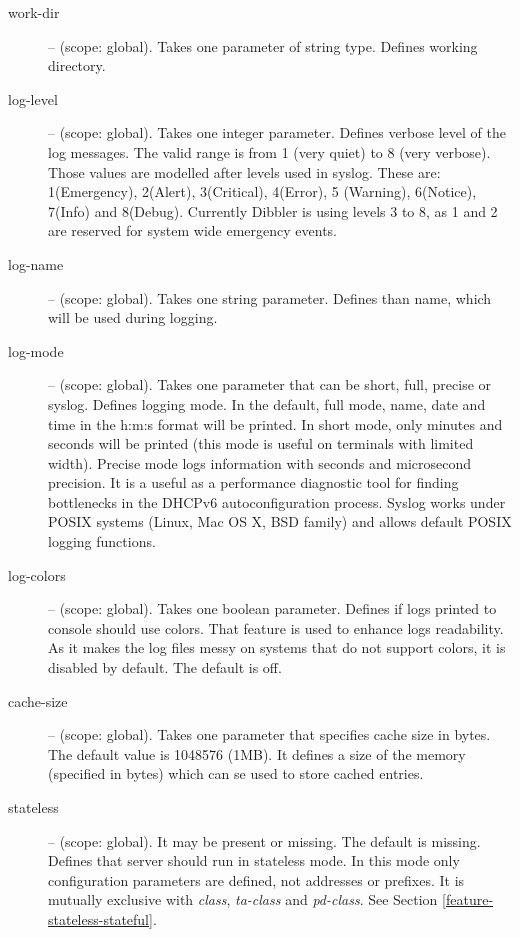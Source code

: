 \begin{description}
\item[work-dir] -- (scope: global). Takes one parameter of string
  type. Defines working directory.

\item[log-level] -- (scope: global). Takes one integer
  parameter. Defines verbose level of the log messages. The valid range
  is from 1 (very quiet) to 8 (very verbose). Those values are modelled
  after levels used in syslog. These are: 1(Emergency), 2(Alert),
  3(Critical), 4(Error), 5 (Warning), 6(Notice), 7(Info) and
  8(Debug). Currently Dibbler is using levels 3 to 8, as 1 and 2 are
  reserved for system wide emergency events.

\item[log-name] -- (scope: global). Takes one string
  parameter. Defines than name, which will be used during logging.

\item[log-mode] -- (scope: global). Takes one parameter that can be
  short, full, precise or syslog. Defines logging mode. In the
  default, full mode, name, date and time in the h:m:s format will be
  printed. In short mode, only minutes and seconds will be printed
  (this mode is useful on terminals with limited width). Precise mode
  logs information with seconds and microsecond precision. It is a
  useful as a performance diagnostic tool for finding bottlenecks in
  the DHCPv6 autoconfiguration process. Syslog works under POSIX
  systems (Linux, Mac OS X, BSD family) and allows default POSIX
  logging functions.

\item[log-colors] -- (scope: global). Takes one boolean parameter.
  Defines if logs printed to console should use colors. That feature
  is used to enhance logs readability.  As it makes the log files
  messy on systems that do not support colors, it is disabled by
  default. The default is off.

 \item[cache-size] -- (scope: global). Takes one parameter that
  specifies cache size in bytes. The default value is 1048576
  (1MB). It defines a size of the memory (specified in bytes) which
  can se used to store cached entries.

\item[stateless] -- (scope: global). It may be present or missing. The
  default is missing. Defines that server should run in stateless
  mode. In this mode only configuration parameters are defined, not
  addresses or prefixes. It is mutually exclusive
  with \emph{class}, \emph{ta-class} and \emph{pd-class}. See
  Section \ref{feature-stateless-stateful}.



\end{description}
